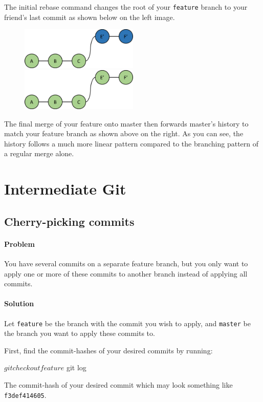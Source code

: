 \documentclass[12pt]{report}
\begin{document}
The initial rebase command changes the root of your \texttt{feature} branch to your friend's last commit as shown below on the left image.

\begin{figure}[h]
\center
\includegraphics[height=2cm]{rebase.png}
\includegraphics[height=2cm]{rebase_merge.png}
\end{figure}

The final merge of your feature onto master then forwards master's history to match your feature branch as shown above on the right.  As you can see, the history follows a much more linear pattern compared to the branching pattern of a regular merge alone.

\chapter{Intermediate Git}
\section{Cherry-picking commits}

\subsubsection*{Problem}

You have several commits on a separate feature branch, but you only want to apply one or more of these commits to another branch instead of applying all commits.

\subsubsection*{Solution}

Let \texttt{feature} be the branch with the commit you wish to apply, and \texttt{master} be the branch you want to apply these commits to.

First, find the commit-hashes of your desired commits by running:
\begin{blockcode}
$ git checkout feature
$ git log
\end{blockcode}
The commit-hash of your desired commit which may look something like \texttt{f3def414605}.
\end{document}
